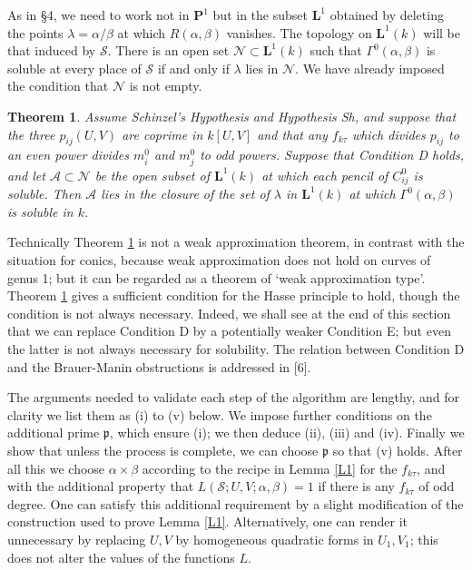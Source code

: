\documentclass[12pt]{article}
\def\bL{{\mathbf L}}
\def\bP{{\mathbf P}}
\def\fp{{\mathfrak p}}
\def\ga{{\alpha}}
\def\gb{{\beta}}
\def\gG{{\Gamma}}
\def\gl{{\lambda}}
\def\sA{{\mathcal A}}
\def\sN{{\mathcal N}}
\def\sS{{\mathcal S}}
\def\Sha{\mbox{\wncyr Sh}}
\def\bth{\begin{theorem} \label}
\def\eth{\end{theorem}}
\newtheorem{theorem}{Theorem}
\begin{document}
As in \S4, we need to work not in $\bP^1$ but in the subset $\bL^1$
obtained by deleting the points $\gl=\ga/\gb$ at which $R(\ga,\gb)$ vanishes.
The topology on $\bL^1(k)$ will be that induced by $\sS$. There is an open
set $\sN\subset\bL^1(k)$ such that $\gG^0(\ga,\gb)$ is soluble at every place
of $\sS$ if and only
if $\gl$ lies in $\sN$. We have already imposed the
condition that $\sN$ is not empty.
\bth{T7} Assume Schinzel's Hypothesis and Hypothesis \Sha, and
suppose that the three $p_{ij}(U,V)$ are coprime in $k[U,V]$
and that any $f_{k\tau}$ which divides $p_{ij}$ to an even
power divides $m_i^0$ and $m_j^0$ to odd powers. Suppose that
Condition D holds, and let $\sA\subset\sN$ be the open subset
of $\bL^1(k)$ at which each pencil of $C^0_{ij}$ is soluble.
Then $\sA$ lies in the closure of the set of $\gl$ in
$\bL^1(k)$ at which $\gG^0(\ga,\gb)$ is soluble in $k$.
\eth
Technically Theorem \ref{T7} is not a weak
approximation theorem, in contrast with the situation for conics, because weak
approximation does not hold on curves of genus 1; but it can be regarded as a
theorem of `weak approximation type'.
Theorem \ref{T7} gives a sufficient condition for the Hasse
principle to hold, though the condition is not always
necessary. Indeed, we shall see at the end of this section
that we can replace Condition D by a potentially weaker
Condition E; but even the latter is not always necessary for
solubility. The relation between Condition D and the
Brauer-Manin obstructions is addressed in [6].

The arguments needed to validate each step of the algorithm
are lengthy, and for clarity we list them as (i) to (v) below.
We impose further conditions on the additional prime $\fp$,
which ensure (i); we then deduce
(ii), (iii) and (iv). Finally we show that unless the process
is complete, we can choose $\fp$ so that (v) holds. After all
this we choose $\ga\times\gb$ according to the recipe in
Lemma \ref{L1}
for the $f_{k\tau}$, and with the additional property that $L(\sS;U,V;\ga,
\gb)=1$ if there is any $f_{k\tau}$ of odd degree. One can satisfy this
additional requirement by a slight modification of the construction used to
prove Lemma \ref{L1}. Alternatively, one can render it unnecessary by replacing
$U,V$ by homogeneous quadratic forms in $U_1,V_1$; this does not alter the
values of the functions $L$.
\end{document}
